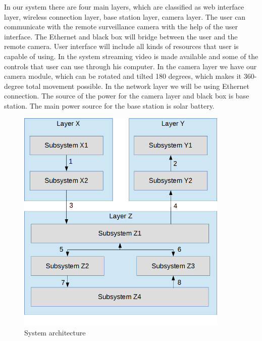 In our system there are four main layers, which are classified as web interface layer, wireless connection layer, base station layer, camera layer. The user can communicate with the remote surveillance camera with the help of the user interface. The Ethernet and black box will bridge between the user and the remote camera. User interface will include all kinds of resources that user is capable of using. In the system streaming video is made available and some of the controls that user can use through his computer. In the camera layer we have our camera module, which can be rotated and tilted 180 degrees, which makes it 360- degree total movement possible. In the network layer we will be using Ethernet connection. The source of the power for the camera layer and black box is base station. The main power source for the base station is solar battery.



\begin{figure}[h!]
	\centering
 	\includegraphics[width=0.90\textwidth]{images/data_flow}
 \caption{System architecture}
\end{figure}
